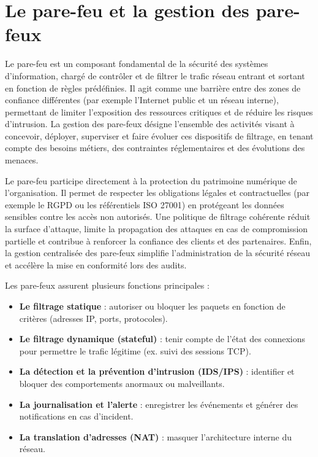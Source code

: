 \section{Le pare-feu et la gestion des pare-feux}

Le pare-feu est un composant fondamental de la sécurité des systèmes d’information, chargé de contrôler et de filtrer le trafic réseau entrant et sortant en fonction de règles prédéfinies. Il agit comme une barrière entre des zones de confiance différentes (par exemple l’Internet public et un réseau interne), permettant de limiter l’exposition des ressources critiques et de réduire les risques d’intrusion. La gestion des pare-feux désigne l’ensemble des activités visant à concevoir, déployer, superviser et faire évoluer ces dispositifs de filtrage, en tenant compte des besoins métiers, des contraintes réglementaires et des évolutions des menaces.

Le pare-feu participe directement à la protection du patrimoine numérique de l’organisation. Il permet de respecter les obligations légales et contractuelles (par exemple le RGPD ou les référentiels ISO 27001) en protégeant les données sensibles contre les accès non autorisés. Une politique de filtrage cohérente réduit la surface d’attaque, limite la propagation des attaques en cas de compromission partielle et contribue à renforcer la confiance des clients et des partenaires. Enfin, la gestion centralisée des pare-feux simplifie l’administration de la sécurité réseau et accélère la mise en conformité lors des audits.

Les pare-feux assurent plusieurs fonctions principales :
\begin{itemize}
	\item \textbf{Le filtrage statique}  : autoriser ou bloquer les paquets en fonction de critères (adresses IP, ports, protocoles).
	\item \textbf{Le filtrage dynamique (stateful)}  : tenir compte de l’état des connexions pour permettre le trafic légitime (ex. suivi des sessions TCP).
	\item \textbf{La détection et la prévention d’intrusion (IDS/IPS)}  : identifier et bloquer des comportements anormaux ou malveillants.
	\item \textbf{La journalisation et l’alerte}  : enregistrer les événements et générer des notifications en cas d’incident.
	\item \textbf{La translation d’adresses (NAT)}  : masquer l’architecture interne du réseau.
\end{itemize}

